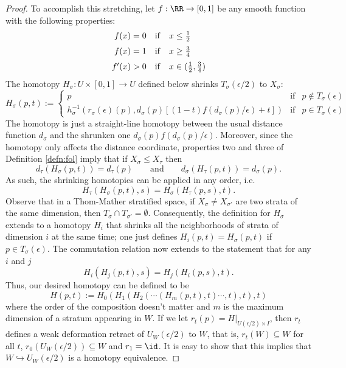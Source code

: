 \begin{proof}
	To accomplish this stretching, let $f:\RR\to [0,1]$ be any smooth function with the following properties:
	\[
		\begin{array}{r c l} 
			f(x)=0 & \mathrm{if} & x\leq \frac{1}{2} \\[\medskipamount]
						f(x)=1 & \mathrm{if} & x\geq \frac{3}{4} \\[\medskipamount]
						f'(x)>0 & \mathrm{if} & x\in(\frac{1}{2},\frac{3}{4})
		\end{array}
	\]
	The homotopy $H_{\sigma}:U\times[0,1]\to U$ defined below shrinks $T_{\sigma}(\epsilon/2)$ to $X_{\sigma}$:
	\[
		H_{\sigma}(p,t):=\left\{\begin{array}{lrl} 
		p & \mathrm{if} & p\notin T_{\sigma}(\epsilon) \\
		h_{\sigma}^{-1}(r_{\sigma}(\epsilon)(p),d_{\sigma}(p)[(1-t) f(d_{\sigma}(p)/\epsilon) + t]) & \mathrm{if} & p\in T_{\sigma}(\epsilon) \end{array}\right.
	\]	
	The homotopy is just a straight-line homotopy between the usual distance function $d_{\sigma}$ and the shrunken one $d_{\sigma}(p)f(d_{\sigma}(p)/\epsilon)$. Moreover, since the homotopy only affects the distance coordinate, properties two and three of Definition \ref{defn:fol} imply that if $X_{\sigma}\leq X_{\tau}$ then
	\[
		d_{\tau}(H_{\sigma}(p,t))=d_{\tau}(p) \qquad \mathrm{and} \qquad d_{\sigma}(H_{\tau}(p,t))=d_{\sigma}(p).
	\]
	As such, the shrinking homotopies can be applied in any order, i.e.
	\[
		H_{\tau}(H_{\sigma}(p,t),s)=H_{\sigma}(H_{\tau}(p,s),t).
	\]
	Observe that in a Thom-Mather stratified space, if $X_{\sigma}\neq X_{\sigma'}$ are two strata of the same dimension, then $T_{\sigma}\cap T_{\sigma'}=\emptyset$. Consequently, the definition for $H_{\sigma}$ extends to a homotopy $H_i$ that shrinks all the neighborhoods of strata of dimension $i$ at the same time; one just defines $H_i(p,t)=H_{\sigma}(p,t)$ if $p\in T_{\sigma}(\epsilon)$. The commutation relation now extends to the statement that for any $i$ and $j$
	\[
		H_{i}(H_{j}(p,t),s)=H_{j}(H_{i}(p,s),t).
	\]
	Thus, our desired homotopy can be defined to be
	\[
		H(p,t):=H_0(H_1(H_2(\cdots (H_m(p,t),t)\cdots,t),t),t)
	\]
	where the order of the composition doesn't matter and $m$ is the maximum dimension of a stratum appearing in $W$. If we let $r_t(p)=H|_{U(\epsilon/2)\times I}$, then $r_t$ defines a weak deformation retract of $U_W(\epsilon/2)$ to $W$, that is, $r_t(W)\subseteq W$ for all $t$, $r_0(U_W(\epsilon/2))\subseteq W$ and $r_1=\id$. It is easy to show that this implies that $W\hookrightarrow U_W(\epsilon/2)$ is a homotopy equivalence.
\end{proof}
